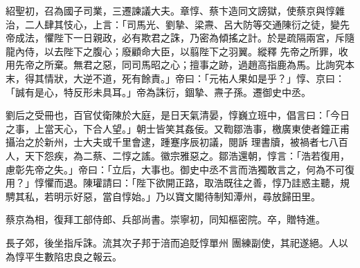 \begin{pinyinscope}
 紹聖初，召為國子司業，三遷諫議大夫。章惇、蔡卞造同文謗獄，使蔡京與惇雜治，二人肆其忮心，上言：「司馬光、劉摯、梁燾、呂大防等交通陳衍之徒，變先帝成法，懼陛下一日親政，必有欺君之誅，乃密為傾搖之計。於是疏隔兩宮，斥隨龍內侍，以去陛下之腹心；廢顧命大臣，以翦陛下之羽翼。縱釋
 先帝之所罪，收用先帝之所棄。無君之惡，同司馬昭之心；擅事之跡，過趙高指鹿為馬。比詢究本末，得其情狀，大逆不道，死有餘責。」帝曰：「元祐人果如是乎？」惇、京曰：「誠有是心，特反形未具耳。」帝為誅衍，錮摯、燾子孫。遷御史中丞。



 劉后之受冊也，百官仗衛陳於大庭，是日天氣清晏，惇巍立班中，倡言曰：「今日之事，上當天心，下合人望。」朝士皆笑其姦佞。又鞫鄒浩事，檄廣東使者鐘正甫攝治之於新州，士大夫或千里會逮，踵蹇序辰初議，閱訴
 理書牘，被禍者七八百人，天下怨疾，為二蔡、二惇之謠。徽宗雅惡之。鄒浩還朝，惇言：「浩若復用，慮彰先帝之失。」帝曰：「立后，大事也。御史中丞不言而浩獨敢言之，何為不可復用？」惇懼而退。陳瓘請曰：「陛下欲開正路，取浩既往之善，惇乃詿惑主聽，規騁其私，若明示好惡，當自惇始。」乃以寶文閣待制知潭州，尋放歸田里。



 蔡京為相，復拜工部侍郎、兵部尚書。崇寧初，同知樞密院。卒，贈特進。



 長子郊，後坐指斥誅。流其次子邦于涪而追貶惇單州
 團練副使，其祀遂絕。人以為惇平生數陷忠良之報云。



\end{pinyinscope}